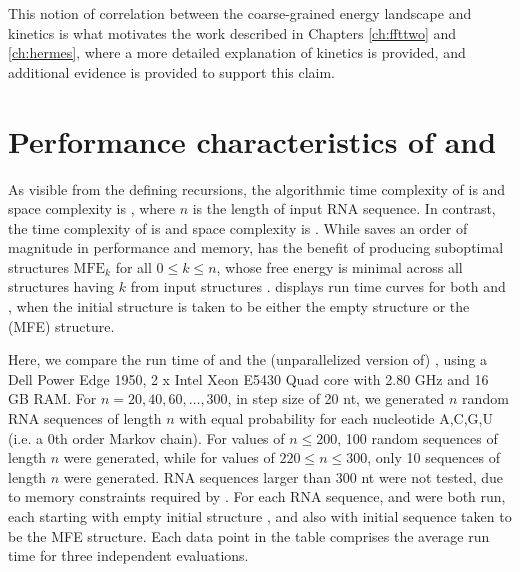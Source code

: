 This notion of correlation between the coarse-grained energy landscape and
kinetics is what motivates the work described in Chapters \ref{ch:ffttwo}
and \ref{ch:hermes}, where a more detailed explanation of kinetics is provided,
and additional evidence is provided to support this claim.

\section{Performance characteristics of \fftbor and \rnabor}
\label{sec:fftbor:speed}

As visible from the defining recursions, the algorithmic time complexity of
\rnabor is  and space complexity is , where $n$ is
the length of input RNA sequence. In contrast, the time complexity of
\fftbor is  and space complexity is .
While \fftbor saves an order of magnitude in performance and memory,
\rnabor has the benefit of producing suboptimal structures $\text{MFE}_k$
for all $0 \leq k \leq n$, whose free energy is minimal across all structures
having \bpd $k$ from input structures \strSt.
 displays run time curves for both
\rnabor and \fftbor, when the initial structure \strSt is
taken to be either the empty structure or the \mfe
(MFE) structure.

Here, we compare the run time of \rnabor \citep{freyhult.b07} and
the (unparallelized version of) \fftbor, using
a Dell Power Edge 1950, 2 x Intel Xeon E5430 Quad
core with 2.80 GHz and 16 GB RAM. For $n = 20,40,60,\dots,300$, in step
size of 20 nt, we generated $n$ random RNA sequences of length $n$ with equal
probability for each nucleotide A,C,G,U (i.e. a $0$th order Markov chain).
For values of $n \leq 200$, 100 random sequences of length
$n$ were generated, while for values of $220 \leq n \leq 300$, only
10 sequences of length $n$ were generated.
RNA sequences larger than 300 nt were not tested,
due to  memory constraints required by \rnabor.
For each RNA sequence, \rnabor and \fftbor were both run,
each starting with empty initial structure \strSt, and also
with initial sequence \strSt taken to be the MFE structure.
Each data point in the table comprises the average run time for three
independent evaluations.

